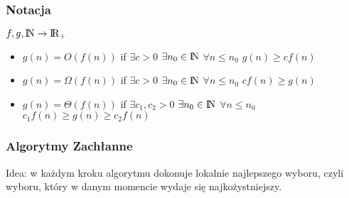 \subsubsection{Notacja}
\(f,g,{\rm I\!N} \rightarrow {\rm I\!R}_+\)
\begin{itemize}
	\item \( g(n) = O(f(n))\) if \(\exists{c}>0\) \(\exists{n_0}\in {\rm I\!N} \) \(\forall{n} \leq n_0\) \(g(n) \geq c f(n)\)
    \item \( g(n) = \Omega(f(n))\) if \(\exists{c}>0\) \(\exists{n_0}\in {\rm I\!N} \) \(\forall{n} \leq n_0\) \(cf(n) \geq g(n)\)
    \item \( g(n) = \Theta(f(n))\) if \(\exists{c_1,c_2}>0\) \(\exists{n_0}\in {\rm I\!N} \) \(\forall{n} \leq n_0\) \(c_1 f(n)\geq g(n) \geq c_2 f(n)\)
\end{itemize}
\subsubsection{Algorytmy Zachłanne}
Idea: w każdym kroku algorytmu dokonuje lokalnie najlepszego wyboru, czyli wyboru, który w danym momencie wydaje się najkożystniejszy.
